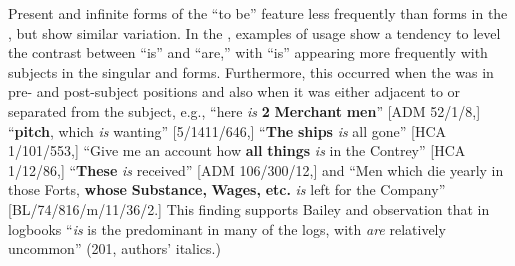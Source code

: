   Present  and infinite forms of the  “to be” feature less frequently than  forms in the , but show similar variation. In the , examples of usage show a tendency to level the contrast between “is” and “are,” with “is” appearing more frequently with  subjects in the singular and   forms. Furthermore, this occurred when the  was in pre- and post-subject positions and also when it was either adjacent to or separated from the subject, e.g., “here \textit{is} \textbf{2} \textbf{Merchant} \textbf{men}” [ADM 52/1/8,] “\textbf{pitch}, which \textit{is} wanting” [5/1411/646,] “\textbf{The} \textbf{ships} \textit{is} all gone” [HCA 1/101/553,] “Give me an account how \textbf{all} \textbf{things} \textit{is} in the Contrey” [HCA 1/12/86,] “\textbf{These} \textit{is} received” [ADM 106/300/12,] and “Men which die yearly in those Forts, \textbf{whose} \textbf{Substance,} \textbf{Wages,} \textbf{etc.} \textit{is} left for the Company” [BL/74/816/m/11/36/2.] This finding supports Bailey and  observation that in  logbooks “\textit{is} is the predominant  in many of the logs, with \textit{are} relatively uncommon” (201, authors’ italics.) 

